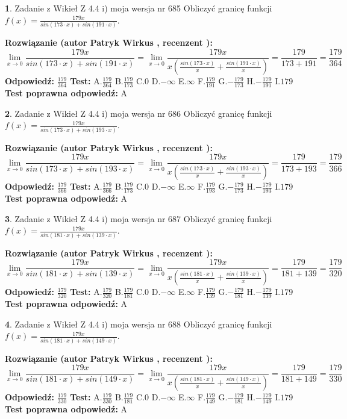 \documentclass[12pt, a4paper]{article}
\theoremstyle{definition} %
\newtheorem{zad}{}
\newcommand{\zadStart}[1]{\begin{zad}#1\newline}
\newcommand{\zadStop}{\end{zad}}
\newcommand{\rozwStart}[2]{\noindent \textbf{Rozwiązanie (autor #1 , recenzent #2): }\newline}
\newcommand{\rozwStop}{\newline}
\newcommand{\odpStart}{\noindent \textbf{Odpowiedź:}\newline}
\newcommand{\odpStop}{\newline}
\newcommand{\testStart}{\noindent \textbf{Test:}\newline}
\newcommand{\testStop}{\newline}
\newcommand{\kluczStart}{\noindent \textbf{Test poprawna odpowiedź:}\newline}
\newcommand{\kluczStop}{\newline}
\begin{document}
\zadStart{Zadanie z Wikieł Z 4.4 i) moja wersja nr 685}
Obliczyć granicę funkcji $f(x)=\frac{179x}{sin(173\cdot x) +sin(191\cdot x)}$.
\zadStop
\rozwStart{Patryk Wirkus}{}
$$\lim\limits_{x\to 0}\frac{179x}{sin(173\cdot x) +sin(191\cdot x)}=\lim\limits_{x\to 0}\frac{179x}{x(\frac{sin(173\cdot x)}{x}+\frac{sin(191\cdot x)}{x})}=\frac{179}{173+191} = \frac{179}{364}$$
\rozwStop
\odpStart
$\frac{179}{364}$
\odpStop
\testStart
A.$\frac{179}{364}$
B.$\frac{179}{173}$
C.$0$
D.$-\infty$
E.$\infty$
F.$\frac{179}{191}$
G.$-\frac{179}{173}$
H.$-\frac{179}{191}$
I.$179$
\testStop
\kluczStart
A
\kluczStop



\zadStart{Zadanie z Wikieł Z 4.4 i) moja wersja nr 686}
Obliczyć granicę funkcji $f(x)=\frac{179x}{sin(173\cdot x) +sin(193\cdot x)}$.
\zadStop
\rozwStart{Patryk Wirkus}{}
$$\lim\limits_{x\to 0}\frac{179x}{sin(173\cdot x) +sin(193\cdot x)}=\lim\limits_{x\to 0}\frac{179x}{x(\frac{sin(173\cdot x)}{x}+\frac{sin(193\cdot x)}{x})}=\frac{179}{173+193} = \frac{179}{366}$$
\rozwStop
\odpStart
$\frac{179}{366}$
\odpStop
\testStart
A.$\frac{179}{366}$
B.$\frac{179}{173}$
C.$0$
D.$-\infty$
E.$\infty$
F.$\frac{179}{193}$
G.$-\frac{179}{173}$
H.$-\frac{179}{193}$
I.$179$
\testStop
\kluczStart
A
\kluczStop



\zadStart{Zadanie z Wikieł Z 4.4 i) moja wersja nr 687}
Obliczyć granicę funkcji $f(x)=\frac{179x}{sin(181\cdot x) +sin(139\cdot x)}$.
\zadStop
\rozwStart{Patryk Wirkus}{}
$$\lim\limits_{x\to 0}\frac{179x}{sin(181\cdot x) +sin(139\cdot x)}=\lim\limits_{x\to 0}\frac{179x}{x(\frac{sin(181\cdot x)}{x}+\frac{sin(139\cdot x)}{x})}=\frac{179}{181+139} = \frac{179}{320}$$
\rozwStop
\odpStart
$\frac{179}{320}$
\odpStop
\testStart
A.$\frac{179}{320}$
B.$\frac{179}{181}$
C.$0$
D.$-\infty$
E.$\infty$
F.$\frac{179}{139}$
G.$-\frac{179}{181}$
H.$-\frac{179}{139}$
I.$179$
\testStop
\kluczStart
A
\kluczStop



\zadStart{Zadanie z Wikieł Z 4.4 i) moja wersja nr 688}
Obliczyć granicę funkcji $f(x)=\frac{179x}{sin(181\cdot x) +sin(149\cdot x)}$.
\zadStop
\rozwStart{Patryk Wirkus}{}
$$\lim\limits_{x\to 0}\frac{179x}{sin(181\cdot x) +sin(149\cdot x)}=\lim\limits_{x\to 0}\frac{179x}{x(\frac{sin(181\cdot x)}{x}+\frac{sin(149\cdot x)}{x})}=\frac{179}{181+149} = \frac{179}{330}$$
\rozwStop
\odpStart
$\frac{179}{330}$
\odpStop
\testStart
A.$\frac{179}{330}$
B.$\frac{179}{181}$
C.$0$
D.$-\infty$
E.$\infty$
F.$\frac{179}{149}$
G.$-\frac{179}{181}$
H.$-\frac{179}{149}$
I.$179$
\testStop
\kluczStart
A
\kluczStop
\end{document}
